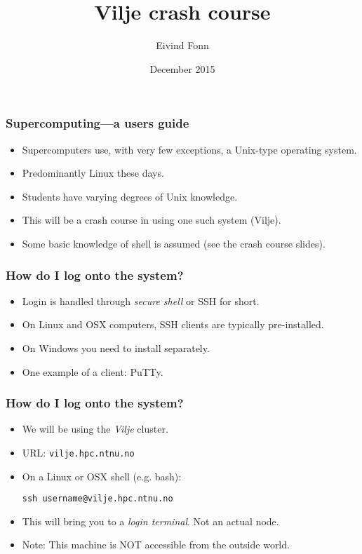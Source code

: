 

\title{Vilje crash course}
\author{Eivind Fonn}
\date{December 2015}
\maketitle

\begin{frame}
  \frametitle{Supercomputing---a users guide}
  \begin{itemize}
  \item Supercomputers use, with very few exceptions, a Unix-type operating system.
  \item Predominantly Linux these days.
  \item Students have varying degrees of Unix knowledge.
  \item This will be a crash course in using one such system (Vilje).
  \item Some basic knowledge of shell is assumed (see the crash course slides).
  \end{itemize}
\end{frame}

\begin{frame}
  \frametitle{How do I log onto the system?}
  \begin{itemize}
  \item Login is handled through \emph{secure shell} or SSH for short.
  \item On Linux and OSX computers, SSH clients are typically pre-installed.
  \item On Windows you need to install separately.
  \item One example of a client: PuTTy.
  \end{itemize}
\end{frame}

\begin{frame}[fragile]
  \frametitle{How do I log onto the system?}
  \begin{itemize}
  \item We will be using the \emph{Vilje} cluster.
  \item URL: \texttt{vilje.hpc.ntnu.no}
  \item On a Linux or OSX shell (e.g. bash):
\begin{lstlisting}[style=shell]
ssh username@vilje.hpc.ntnu.no
\end{lstlisting}
  \item This will bring you to a \emph{login terminal}. Not an actual node.
  \item Note: This machine is NOT accessible from the outside world.
  \end{itemize}
\end{frame}

